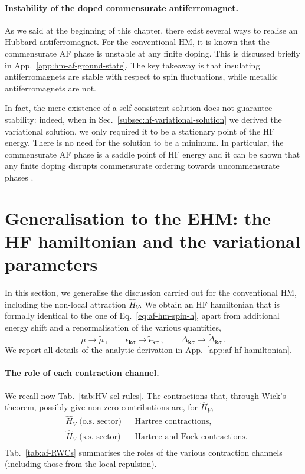 \paragraph{Instability of the doped commensurate antiferromagnet.}

As we said at the beginning of this chapter, there exist several ways to realise an Hubbard antiferromagnet. For the conventional HM, it is known \cite{singh1990collective,singh1991doped} that the commensurate AF phase is unstable at any finite doping. This is discussed briefly in App.~\ref{app:hm-af-ground-state}. The key takeaway is that insulating antiferromagnets are stable with respect to spin fluctuations, while metallic antiferromagnets are not.

In fact, the mere existence of a self-consistent solution does not guarantee stability: indeed, when in Sec.~\ref{subsec:hf-variational-solution} we derived the variational solution, we only required it to be a stationary point of the HF energy. There is no need for the solution to be a minimum. In particular, the commensurate AF phase is a saddle point of HF energy and it can be shown that any finite doping disrupts commensurate ordering towards uncommensurate phases \cite{singh1990collective}.

\section{Generalisation to the EHM: the HF hamiltonian and the variational parameters}\label{sec:af-hf-hfps}

In this section, we generalise the discussion carried out for the conventional HM, including the non-local attraction $\hat H_V$. We obtain an HF hamiltonian that is formally identical to the one of Eq.~\eqref{eq:af-hm-spin-h}, apart from additional energy shift and a renormalisation of  the various quantities,
\[
	\mu \to \tilde{\mu} \, ,
	\qquad
	\epsilon_{\mathbf{k}\sigma} \to \tilde{\epsilon}_{\mathbf{k}\sigma} \, ,
	\qquad
	\Delta_{\mathbf{k}\sigma} \to \tilde{\Delta}_{\mathbf{k}\sigma} \, .
\]
We report all details of the analytic derivation in App.~\ref{app:af-hf-hamiltonian}.

\paragraph{The role of each contraction channel.}

We recall now Tab.~\ref{tab:HV-sel-rules}. The contractions that, through Wick's theorem, possibly give non-zero contributions are, for $\hat H_V$,
\[
\begin{aligned}
	&\hat H_V \text{ (o.s. sector)}
	&&\text{Hartree contractions,} \\
	&\hat H_V \text{ (s.s. sector)}
	&&\text{Hartree and Fock contractions.} \\
\end{aligned}	
\]
Tab.~\ref{tab:af-RWCs} summarises the roles of the various contraction channels (including those from the local repulsion).

